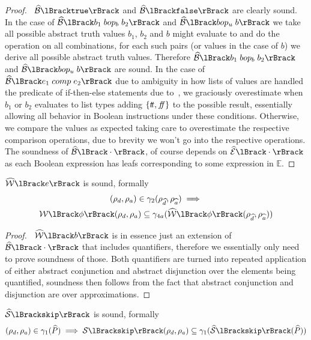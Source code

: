 \begin{proof}
    \pfsketch\
    $\absboolsem{\texttt{true}}$ and $\absboolsem{\texttt{false}}$ are clearly sound.
    In the case of $\absboolsem{b_1 \; bop_b \; b_2}$ and $\absboolsem{bop_u \; b}$ we take all possible abstract truth values $b_1$, $b_2$ and $b$ might evaluate to and do the operation on all combinations, for each such pairs (or values in the case of $b$) we derive all possible abstract truth values.
    Therefore $\absboolsem{b_1 \; bop_b \; b_2}$ and $\absboolsem{bop_u \; b}$ are sound.
    In the case of $\absboolsem{e_1 \; comp \; e_2}$ due to ambiguity in how lists of values are handled the predicate of if-then-else statements due to~\cite{halder_abstract_2012}, we graciously overestimate when $b_1$ or $b_2$ evaluates to list types adding $\{t\!t, f\!\!f\}$ to the possible result, essentially allowing all behavior in Boolean instructions under these conditions.
    Otherwise, we compare the values as expected taking care to overestimate the respective comparison operations, due to brevity we won't go into the respective operations.
    The soundness of $\absboolsem{\cdot}$, of course depends on $\absexpsem{\cdot}$ as each Boolean expression has leafs corresponding to some expression in $\mathbb{E}$.
\end{proof}


\begin{conjecture}
    \label{thm:sound-bexp}
    $\abspredsem{e}$ is sound, formally
    \begin{multline*}
    (\rho_d, \rho_a)
        \in \concrete_2(\env{\ab{d}}, \env{\ab{a}}) \implies \\
        \predsem{\phi}(\rho_d, \rho_a) \subseteq \concrete_{4a}(\abspredsem{\phi}(\env{\ab{d}}, \env{\ab{a}}))
    \end{multline*}
\end{conjecture}


\begin{proof}
    \pfsketch\
    $\abspredsem{b}$ is in essence just an extension of $\absboolsem{\cdot}$ that includes quantifiers, therefore we essentially only need to prove soundness of those.
    Both quantifiers are turned into repeated application of either abstract conjunction and abstract disjunction over the elements being quantified, soundness then follows from the fact that abstract conjunction and disjunction are over approximations.
\end{proof}


\begin{conjecture}
    \label{thm:sound-skip}
    $\abssem{\texttt{skip}}$ is sound, formally
    \begin{equation*}
    (\rho_d, \rho_a)
        \in \concrete_1(\ab{P}) \implies \sem{\texttt{skip}}(\rho_d, \rho_a) \subseteq \concrete_1(\abssem{\texttt{skip}}(\ab{P}))
    \end{equation*}
\end{conjecture}


